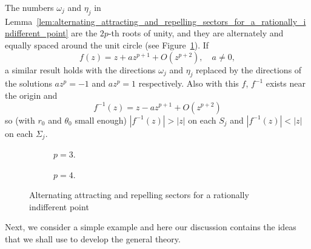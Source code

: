 The numbers $\omega_j$ and $\eta_j$ in
Lemma~\ref{lem:alternating_attracting_and_repelling_sectors_for_a_rationally_indifferent_point}
are the $2p$-th roots of unity, and they are alternately and equally spaced
around the unit circle (see
Figure~\ref{fig:alternating_attracting_and_repelling_sectors_for_a_rationally_indifferent_point}).
If
\begin{equation*}
    f(z) = z + az^{p+1} + O(z^{p+2}), \quad a \neq 0,
\end{equation*}
a similar result holds with the directions $\omega_j$ and $\eta_j$ replaced by
the directions of the solutions $az^p = -1$ and $az^p = 1$ respectively. Also
with this $f$, $f^{-1}$ exists near the origin and
\begin{equation*}
    f^{-1}(z) = z - az^{p+1} + O(z^{p+2})
\end{equation*}
so (with $r_0$ and $\theta_0$ small enough) $|f^{-1}(z)| > |z|$ on each $S_j$
and $|f^{-1}(z)| < |z|$ on each $\Sigma_j$.

\begin{figure}[htbp]
    \centering
    \begin{subfigure}[b]{0.38\textwidth}
        \centering
        \resizebox{\textwidth}{!}{}
        \caption{$p = 3$.}
    \end{subfigure}
    \begin{subfigure}[b]{0.38\textwidth}
        \centering
        \resizebox{\textwidth}{!}{}
        \caption{$p = 4$.}
    \end{subfigure}
    \caption{Alternating attracting and repelling sectors for a rationally
    indifferent point}
    \label{fig:alternating_attracting_and_repelling_sectors_for_a_rationally_indifferent_point}
\end{figure}

Next, we consider a simple example and here our discussion contains the ideas
that we shall use to develop the general theory.

